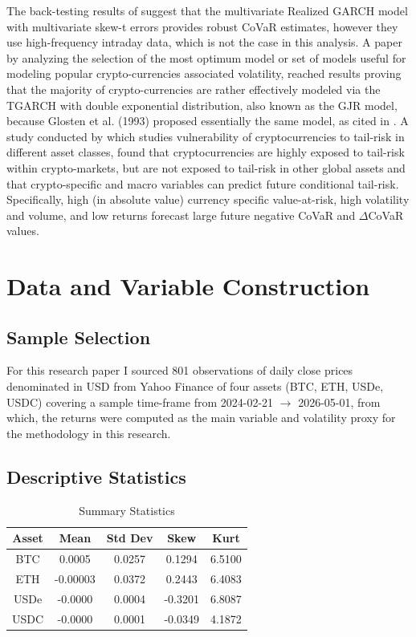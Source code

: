 \documentclass[12pt,a4paper,titlepage,oneside,english]{article}
\begin{document}
 The back-testing results of \parencite{CHEN2023103753} suggest that the multivariate Realized GARCH model with multivariate skew-t errors provides robust CoVaR estimates, however they use high-frequency intraday data, which is not the case in this analysis. A paper by \parencite{FAKHFEKH2020101075} analyzing the selection of the most optimum model or set of models useful for modeling popular crypto-currencies associated volatility, reached results proving that the majority of crypto-currencies are rather effectively modeled via the TGARCH with double exponential distribution, also known as the GJR model, because Glosten et al. (1993) proposed essentially the same model, as cited in \parencite{FAKHFEKH2020101075}.
A study conducted by \parencite{BORRI20191} which studies vulnerability of cryptocurrencies to tail-risk in different asset classes, found that cryptocurrencies are highly exposed to tail-risk within crypto-markets, but are not exposed to tail-risk in other global assets and that crypto-specific and macro variables can predict future conditional tail-risk. Specifically, high (in absolute value) currency specific value-at-risk, high volatility and volume, and low returns forecast large future negative CoVaR and $\Delta$CoVaR values.

\section{Data and Variable Construction}

\subsection{Sample Selection}
For this research paper I sourced 801 observations of daily close prices denominated in USD  from Yahoo Finance of four assets (BTC, ETH, USDe, USDC) covering a sample time-frame from 2024-02-21 $\rightarrow$ 2026-05-01, from which, the returns were computed as the main variable and volatility proxy for the methodology in this research. 
\subsection{Descriptive Statistics}
\begin{table}[H]
    \centering
    \begin{tabular}{ccccc}
    \toprule
        Asset & Mean & Std Dev & Skew & Kurt\\
    \midrule
         BTC& 0.0005 & 0.0257 & 0.1294 & 6.5100\\
         ETH& -0.00003 & 0.0372 & 0.2443 & 6.4083\\
         USDe&  -0.0000& 0.0004 & -0.3201 & 6.8087\\
         USDC& -0.0000 & 0.0001 & -0.0349 & 4.1872\\
    \bottomrule
    \end{tabular}
    \caption{Summary Statistics}
    \label{tab:descr}
\end{table}
\end{document}
